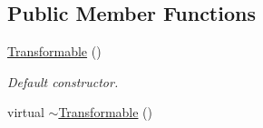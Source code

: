 \subsection*{Public Member Functions}
\begin{DoxyCompactItemize}
\item 
\hypertarget{classsf_1_1Transformable_ae71710de0fef423121bab1c684954a2e}{\hyperlink{classsf_1_1Transformable_ae71710de0fef423121bab1c684954a2e}{Transformable} ()}\label{classsf_1_1Transformable_ae71710de0fef423121bab1c684954a2e}

\begin{DoxyCompactList}\small\item\em Default constructor. \end{DoxyCompactList}\item 
\hypertarget{classsf_1_1Transformable_a43253abcb863195a673c2a347a7425cc}{virtual \hyperlink{classsf_1_1Transformable_a43253abcb863195a673c2a347a7425cc}{$\sim$\-Transformable} ()}\label{classsf_1_1Transformable_a43253abcb863195a673c2a347a7425cc}


\end{DoxyCompactItemize}
